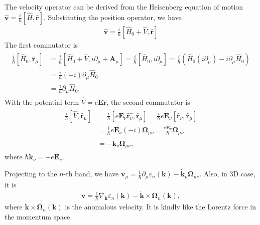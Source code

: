 \documentclass[12pt, oneside]{article}
\newcommand{\pa}{\partial}
\newcommand{\p}[1]{\left(#1\right)}
\newcommand{\bb}[1]{\left[#1\right]}
\numberwithin{equation}{subsection}
\begin{document}
The velocity operator can be derived from the Heisenberg equation of motion \(\hat{\bm{v}} = \frac{i}{\hbar} \bb{\hat{H}, \hat{\bm{r}}}\). Substituting the position operator, we have
\begin{align}
	\hat{{\bm{v}}} = \frac{i}{\hbar} \bb{\hat{H}_0 + \hat{V}, \hat{\bm{r}}}
\end{align}
The first commutator is
\begin{align}
	\begin{split}
		\frac{i}{\hbar} \bb{\hat{H}_0, \hat{\bm{r}}_{\mu}} & = \frac{i}{\hbar} \bb{\hat{H}_0 + \hat{V}, i \pa_{\mu} + \bm{A}_\mu} = \frac{i}{\hbar} \bb{ \hat{H}_0, i \pa_{\mu}} = \frac{i}{\hbar} \p{\hat{H}_0 \p{i \pa_\mu} - i \partial_\mu \hat{H}_0} \\
		& = \frac{i}{\hbar} \p{-i} \pa_\mu \hat{H}_0 \\
		& = \frac{1}{\hbar} \pa_\mu \hat{H}_0.
	\end{split}
\end{align}
With the potential term \(\hat{V} = e \bm{E} \hat{\bm{r}}\), the second commutator is
\begin{align}
	\begin{split}
		\frac{i}{\hbar} \bb{\hat{V}, \hat{\bm{r}}_\mu} & = \frac{i}{\hbar} \bb{e \bm{E}_\nu \hat{\bm{r}_\nu}, \hat{\bm{r}}_\mu} = \frac{i}{\hbar} e \bm{E}_\nu \bb{\hat{\bm{r}}_\nu, \hat{\bm{r}}_\mu} \\
		& = \frac{i}{\hbar} e \bm{E}_\nu \p{-i} \bm{\Omega}_{\mu \nu}  = \frac{e \bm{E}_\nu}{\hbar} \bm{\Omega}_{\mu \nu}\\
		& = - \dot{\bm{k}}_\nu \bm{\Omega}_{\mu \nu},
	\end{split}
\end{align}
where \(\hbar \dot{\bm{k}}_\nu = -e \bm{E}_\nu\).


Projecting to the \(n\)-th band, we have \(\bm{v}_\mu = \frac{1}{\hbar} \pa_\mu \varepsilon_n \p{\bm{k}} - \dot{\bm{k}}_\nu \bm{\Omega}_{\mu \nu} \). Also, in 3D case, it is 
\begin{align}
	\boxed{\bm{v} = \frac{1}{\hbar} \nabla_{\bm{k}} \varepsilon_n \p{\bm{k}} - \dot{\bm{k}} \times \bm{\Omega}_{n} \p{\bm{k}}},
\end{align}
where \( \dot{\bm{k}} \times \bm{\Omega}_{n} \p{\bm{k}}\) is the anomalous velocity. It is kindly like the Lorentz force in the momentum space.
\end{document}
